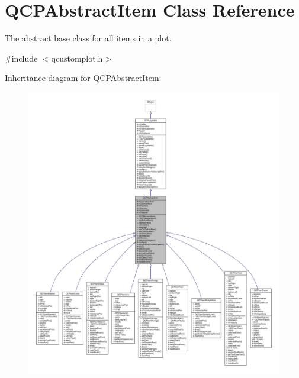 \hypertarget{class_q_c_p_abstract_item}{}\section{Q\+C\+P\+Abstract\+Item Class Reference}
\label{class_q_c_p_abstract_item}


The abstract base class for all items in a plot.  




{\ttfamily \#include $<$qcustomplot.\+h$>$}



Inheritance diagram for Q\+C\+P\+Abstract\+Item\+:\nopagebreak
\begin{figure}[H]
\begin{center}
\leavevmode
\includegraphics[width=350pt]{class_q_c_p_abstract_item__inherit__graph}
\end{center}
\end{figure}


